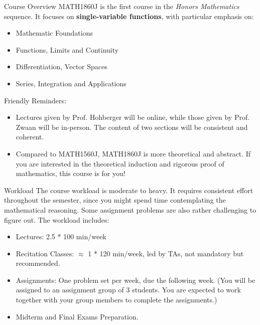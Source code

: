 \documentclass[dvipsnames]{beamer}
\begin{document}
\begin{frame}{Course Overview}
MATH1860J is the first course in the \textit{Honors Mathematics} sequence. It focuses on \textbf{single-variable functions}, with particular emphasis on:
    \begin{itemize}
        \item Mathematic Foundations
        \item Functions, Limits and Continuity
        \item Differentiation, Vector Spaces
        \item Series, Integration and Applications
    \end{itemize}
\vspace{0.3cm}
Friendly Reminders:
    \begin{itemize}
        \item Lectures given by Prof. Hohberger will be online, while those given by Prof. Zwaan will be in-person. The content of two sections will be consistent and coherent.
        \item Compared to MATH1560J, MATH1860J is more theoretical and abstract. If you are interested in the theoretical induction and rigorous proof of mathematics, this course is for you!
    \end{itemize}
\end{frame}

\begin{frame}{Workload}
    The course workload is moderate to heavy. It requires consistent effort throughout the semester, since you might spend time contemplating the mathematical reasoning. Some assignment problems are also rather challenging to figure out. The workload includes:
    \vspace{0.25cm}
    \begin{itemize}
        \item Lectures: 2.5 * 100 min/week
        \item Recitation Classes: $\approx$ 1 * 120 min/week, led by TAs, not mandatory but recommended.
        \item Assignments: One problem set per week, due the following week. (You will be assigned to an assignment group of 3 students. You are expected to work together with your group members to complete the assignments.)
        \item Midterm and Final Exams Preparation.
    \end{itemize}
\end{frame}
\end{document}
